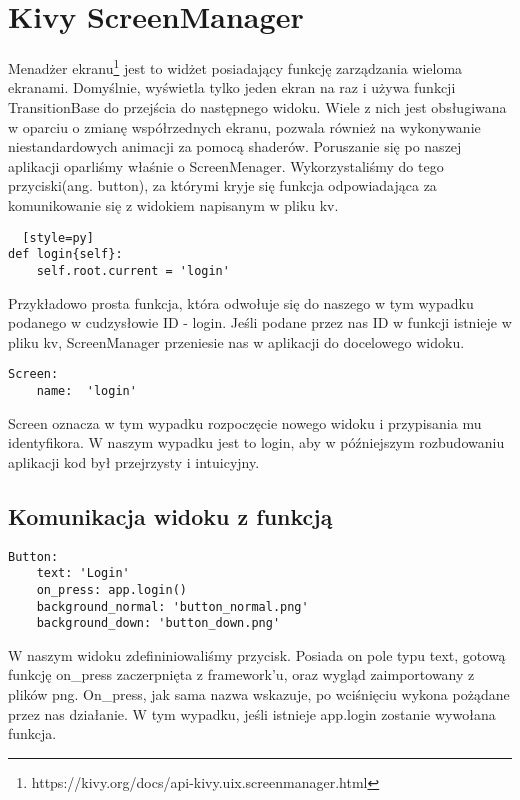 \documentclass{xmgr}
\begin{document}
\section{Kivy ScreenManager}
Menadżer ekranu\footnote{https://kivy.org/docs/api-kivy.uix.screenmanager.html} jest to widżet posiadający funkcję zarządzania wieloma ekranami. Domyślnie, wyświetla tylko jeden ekran na raz i używa funkcji TransitionBase do przejścia do następnego widoku. Wiele z nich jest obsługiwana w oparciu o zmianę współrzednych ekranu, pozwala również na wykonywanie niestandardowych animacji za pomocą shaderów.
Poruszanie się po naszej aplikacji oparliśmy właśnie o ScreenMenager. Wykorzystaliśmy do tego przyciski(ang. button), za którymi kryje się funkcja odpowiadająca za komunikowanie się z widokiem napisanym w pliku kv. 

\begin{lstlisting}  [style=py] 
def login{self}:
	self.root.current = 'login'
\end{lstlisting}
Przykładowo prosta funkcja, która odwołuje się do naszego w tym wypadku podanego w cudzysłowie ID - login. Jeśli podane przez nas ID w funkcji istnieje w pliku kv, ScreenManager przeniesie nas w aplikacji do docelowego widoku. 
\begin{lstlisting}  
Screen:
	name:  'login'
\end{lstlisting}
Screen oznacza w tym wypadku rozpoczęcie nowego widoku i przypisania mu identyfikora. W naszym wypadku jest to login, aby w późniejszym rozbudowaniu aplikacji kod był przejrzysty i intuicyjny. 
\subsection{Komunikacja widoku z funkcją}
\begin{lstlisting}  
Button:
	text: 'Login'
	on_press: app.login()
	background_normal: 'button_normal.png'
	background_down: 'button_down.png'
\end{lstlisting}
W naszym widoku zdefininiowaliśmy przycisk. Posiada on pole typu text, gotową funkcję on\_press zaczerpnięta z framework'u, oraz wygląd zaimportowany z plików png. On\_press, jak sama nazwa wskazuje, po wciśnięciu wykona pożądane przez nas działanie. W tym wypadku, jeśli istnieje app.login zostanie wywołana funkcja.  
\end{document}
